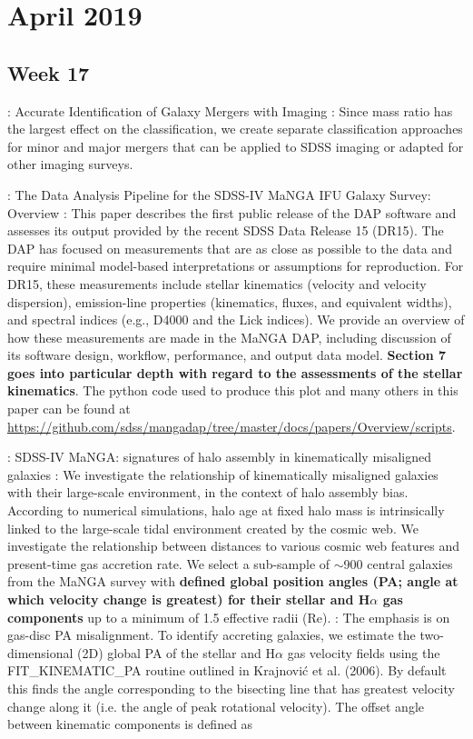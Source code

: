 \documentclass[ceqn,usenatbib,onecolumn]{mnras}
\begin{document}
\section{April 2019}
\subsection{Week 17}
\par \citet{2019ApJ...872...76N} : {Accurate Identification of Galaxy Mergers with Imaging} : Since mass ratio has the largest effect on the classification, we create separate classification approaches for minor and major mergers that can be applied to SDSS imaging or adapted for other imaging surveys.
\par \citet{2019arXiv190100856W} : {The Data Analysis Pipeline for the SDSS-IV MaNGA IFU Galaxy Survey: Overview} : This paper describes the first public release of the DAP software and assesses its output provided by the recent SDSS Data Release 15 (DR15). The DAP has focused on measurements that are as close as possible to the data and require minimal model-based interpretations or assumptions for reproduction. For DR15, these measurements include stellar kinematics (velocity and velocity dispersion), emission-line properties (kinematics, fluxes, and equivalent widths), and spectral indices (e.g., D4000 and the Lick indices). We provide an overview of how these measurements are made in the MaNGA DAP, including discussion of its software design, workflow, performance, and output data model. \textbf{Section 7 goes into particular depth with regard to the assessments of the
stellar kinematics}. The python code used to produce this plot and many others
in this paper can be found at \url{https://github.com/sdss/mangadap/tree/master/docs/papers/Overview/scripts}.
\par \citet{2019MNRAS.483..172D} : {SDSS-IV MaNGA: signatures of halo assembly in kinematically misaligned galaxies} : We investigate the relationship of kinematically misaligned galaxies with their large-scale environment, in the context of halo assembly bias. According to numerical simulations, halo age at fixed halo mass is intrinsically linked to the large-scale tidal environment created by the cosmic web. We investigate the relationship between distances to various cosmic web features and present-time gas accretion rate. We select a sub-sample of $\sim$900 central galaxies from the MaNGA survey with \textbf{defined global position angles (PA; angle at which velocity change is greatest) for their stellar and H$\alpha$ gas components} up to a minimum of 1.5 effective radii (Re). : The emphasis is on gas-disc PA misalignment. To identify accreting galaxies, we estimate the two-dimensional (2D) global PA of the stellar and H$\alpha$ gas velocity fields using the FIT\_KINEMATIC\_PA routine outlined in Krajnović et al. (2006). By default this finds the angle corresponding to the bisecting line that has greatest velocity change along it (i.e. the angle of peak rotational velocity). The offset angle between kinematic components is defined as  
\end{document}

